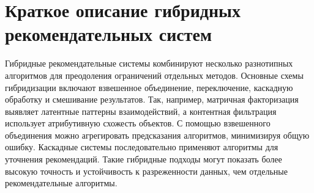 \chapter{Краткое описание гибридных рекомендательных систем}

Гибридные рекомендательные системы комбинируют несколько разнотипных алгоритмов для преодоления ограничений отдельных методов. Основные схемы гибридизации включают взвешенное объединение, переключение, каскадную обработку и смешивание результатов. Так, например, матричная факторизация выявляет латентные паттерны взаимодействий, а контентная фильтрация использует атрибутивную схожесть объектов. С помощью взвешенного объединения можно агрегировать предсказания алгоритмов, минимизируя общую ошибку. Каскадные системы последовательно применяют алгоритмы для уточнения рекомендаций. Такие гибридные подходы могут показать более высокую точность и устойчивость к разреженности данных, чем отдельные рекомендательные алгоритмы.



\clearpage
